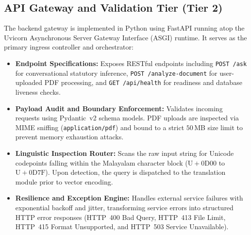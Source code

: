 \documentclass[12pt,a4paper]{report}
\begin{document}
\subsection{API Gateway and Validation Tier (Tier 2)}
The backend gateway is implemented in Python using FastAPI running atop the Uvicorn Asynchronous Server Gateway Interface (ASGI) runtime. It serves as the primary ingress controller and orchestrator:
\begin{itemize}
    \item \textbf{Endpoint Specifications:} Exposes RESTful endpoints including \texttt{POST /ask} for conversational statutory inference, \texttt{POST /analyze-document} for user-uploaded PDF processing, and \texttt{GET /api/health} for readiness and database liveness checks.
    \item \textbf{Payload Audit and Boundary Enforcement:} Validates incoming requests using Pydantic~v2 schema models. PDF uploads are inspected via MIME sniffing (\texttt{application/pdf}) and bound to a strict $50$\,MB size limit to prevent memory exhaustion attacks.
    \item \textbf{Linguistic Inspection Router:} Scans the raw input string for Unicode codepoints falling within the Malayalam character block ($\mathrm{U{+}0D00}$ to $\mathrm{U{+}0D7F}$). Upon detection, the query is dispatched to the translation module prior to vector encoding.
    \item \textbf{Resilience and Exception Engine:} Handles external service failures with exponential backoff and jitter, transforming service errors into structured HTTP error responses (HTTP~400 Bad Query, HTTP~413 File Limit, HTTP~415 Format Unsupported, and HTTP~503 Service Unavailable).
\end{itemize}
\end{document}
